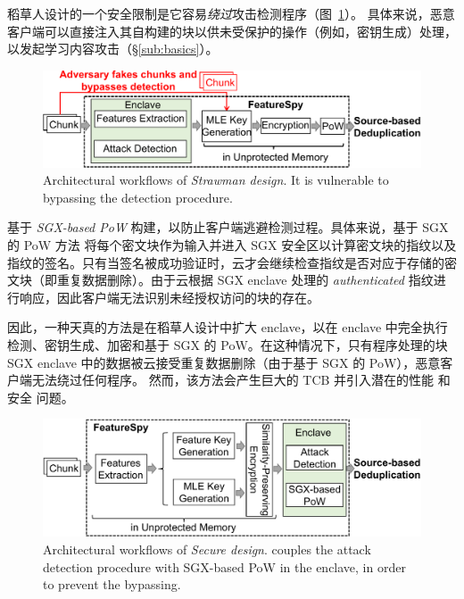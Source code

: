 稻草人设计的一个安全限制是它容易{\em 绕过}攻击检测程序（图~\ref{fig:architecture-strawman}）。 具体来说，恶意客户端可以直接注入其自构建的块以供未受保护的操作（例如，密钥生成）处理，以发起学习内容攻击（\S\ref{sub:basics}）。


\begin{figure}
  \centering
  \includegraphics[width=\textwidth]{pic/featurespy/naive.pdf}
  \caption{Architectural workflows of \textit{Strawman design}. It is vulnerable to bypassing the detection procedure.}
  \label{fig:architecture-strawman}
\end{figure}

\sysnameF 基于 {\em SGX-based PoW} \cite{ren21} 构建，以防止客户端逃避检测过程。具体来说，基于 SGX 的 PoW 方法 \cite{ren21} 将每个密文块作为输入并进入 SGX 安全区以计算密文块的指纹以及指纹的签名。只有当签名被成功验证时，云才会继续检查指纹是否对应于存储的密文块（即重复数据删除）。由于云根据 SGX enclave 处理的 {\em authenticated} 指纹进行响应，因此客户端无法识别未经授权访问的块的存在。

因此，一种天真的方法是在稻草人设计中扩大 enclave，以在 enclave 中完全执行检测、密钥生成、加密和基于 SGX 的 PoW。在这种情况下，只有程序处理的块SGX enclave 中的数据被云接受重复数据删除（由于基于 SGX 的 PoW），恶意客户端无法绕过任何程序。
然而，该方法会产生巨大的 TCB 并引入潜在的性能 \cite{arnautov16, harnik18, dinhngoc19} 和安全 \cite{lie05} 问题。

\begin{figure}
  \centering
  \includegraphics[width=\textwidth]{pic/featurespy/architecture.pdf}
  \caption{Architectural workflows of \textit{Secure design}. \sysnameF couples the attack detection procedure with SGX-based PoW \cite{ren21} in the enclave, in order to prevent the bypassing.}
  \label{fig:architecture-secure}
\end{figure}


